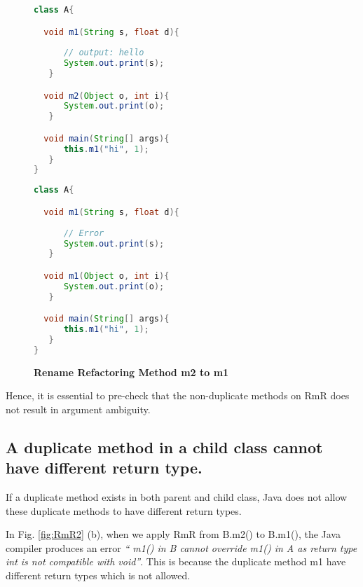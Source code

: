 \begin{figure}[th]
\centering
\begin{minipage}[t]{0.48\linewidth}
\begin{lstlisting}[language=java, basicstyle=\scriptsize\ttfamily,frame=single]
class A{

  void m1(String s, float d){
	
      // output: hello
      System.out.print(s); 
   }

  void m2(Object o, int i){
      System.out.print(o);
   }

  void main(String[] args){
      this.m1("hi", 1);
   }
}
\end{lstlisting}
\end{minipage}
\hfill
\begin{minipage}[t]{0.48\linewidth}
\begin{lstlisting}[language=java, basicstyle=\scriptsize\ttfamily,frame=single]
class A{

  void m1(String s, float d){
	
      // Error
      System.out.print(s); 
   }

  void m1(Object o, int i){
      System.out.print(o);
   }

  void main(String[] args){
      this.m1("hi", 1);
   }
}

\end{lstlisting}
\end{minipage}
\caption{\textbf{Rename Refactoring Method m2 to m1}}
\label{fig:RmR5}
\end{figure}

Hence, it is essential to pre-check that the non-duplicate methods on RmR does not result in argument ambiguity.

\subsection{A duplicate method in a child class cannot have different return type.}

If a duplicate method exists in both parent and child class, Java does not allow these duplicate methods to have different return types.

In Fig. \ref{fig:RmR2} (b), when we apply RmR from B.m2() to B.m1(), the Java compiler produces an error \textsl{`` m1() in B cannot override m1() in A as return type int is not compatible with void''}. This is because the duplicate method m1 have different return types which is not allowed. 

